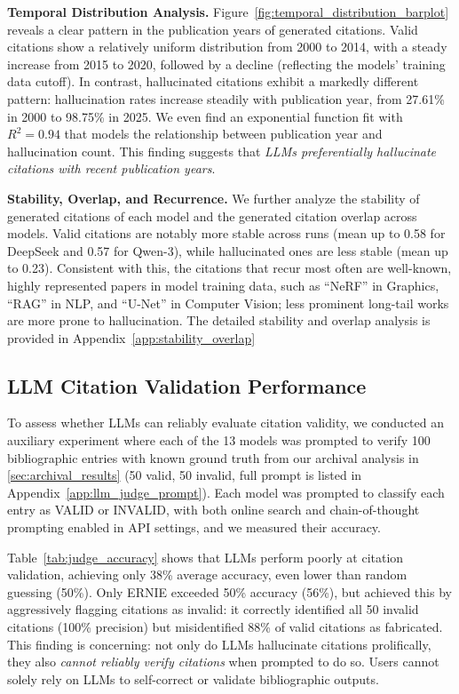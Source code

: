 \noindent
\textbf{Temporal Distribution Analysis.}
Figure~\ref{fig:temporal_distribution_barplot} reveals a clear pattern in the publication years of generated citations.
Valid citations show a relatively uniform distribution from 2000 to 2014, with a steady increase from 2015 to 2020, followed by a decline (reflecting the models' training data cutoff).
In contrast, hallucinated citations exhibit a markedly different pattern: hallucination rates increase steadily with publication year, from 27.61\% in 2000 to 98.75\% in 2025. We even find an exponential function fit with $R^2=0.94$ that models the relationship between publication year and hallucination count.
This finding suggests that \textit{LLMs preferentially hallucinate citations with recent publication years}.



\noindent
\textbf{Stability, Overlap, and Recurrence.}
We further analyze the stability of generated citations of each model and the generated citation overlap across models. Valid citations are notably more stable across runs (mean up to 0.58 for DeepSeek and 0.57 for Qwen-3), while hallucinated ones are less stable (mean up to 0.23).
Consistent with this, the citations that recur most often are well-known, highly represented papers in model training data, such as ``NeRF'' in Graphics, ``RAG'' in NLP, and ``U-Net'' in Computer Vision; less prominent long-tail works are more prone to hallucination.
The detailed stability and overlap analysis is provided in Appendix~\ref{app:stability_overlap}


\subsection{LLM Citation Validation Performance}
\label{subsec:llm_as_judge}


To assess whether LLMs can reliably evaluate citation validity, we conducted an auxiliary experiment where each of the 13 models was prompted to verify 100 bibliographic entries with known ground truth from our archival analysis in \cref{sec:archival_results} (50 valid, 50 invalid, full prompt is listed in Appendix~\ref{app:llm_judge_prompt}).
Each model was prompted to classify each entry as VALID or INVALID, with both online search and chain-of-thought prompting enabled in API settings, and we measured their accuracy.

Table~\ref{tab:judge_accuracy} shows that LLMs perform poorly at citation validation, achieving only 38\% average accuracy, even lower than random guessing (50\%).
Only ERNIE exceeded 50\% accuracy (56\%), but achieved this by aggressively flagging citations as invalid: it correctly identified all 50 invalid citations (100\% precision) but misidentified 88\% of valid citations as fabricated.
This finding is concerning: not only do LLMs hallucinate citations prolifically, they also \textit{cannot reliably verify citations} when prompted to do so. Users cannot solely rely on LLMs to self-correct or validate bibliographic outputs.

